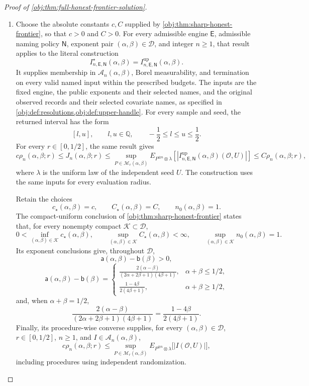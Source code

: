 \documentclass[11pt]{article}
\begin{document}
\begin{proof}[Proof of \cref{obj:thm:full-honest-frontier-solution}]
\begin{enumerate}
\item Choose the absolute constants \(c,C\) supplied by
\cref{obj:thm:sharp-honest-frontier}, so that \(c>0\) and \(C>0\).
For every admissible engine \(\mathsf E\), admissible naming policy
\(\mathsf N\), exponent pair \((\alpha,\beta)\in\mathcal D\), and integer
\(n\ge1\), that result applies to the literal construction
\[
I^\star_{n,\mathsf E,\mathsf N}(\alpha,\beta)
=
I^{\mathrm{up}}_{n,\mathsf E,\mathsf N}(\alpha,\beta).
\]
It supplies membership in \(\mathcal A_n(\alpha,\beta)\), Borel
measurability, and termination on every valid named input within the
prescribed budgets. The inputs are the fixed engine, the public exponents
and their selected names, and the original observed records and their
selected covariate names, as specified in
\cref{obj:def:resolutions,obj:def:upper-handle}. For every sample and seed,
the returned interval has the form
\[
[l,u],\qquad l,u\in\mathbb Q,\qquad
-\frac12\le l\le u\le\frac12.
\]
For every \(r\in[0,1/2]\), the same result gives
\[
c\rho_n(\alpha,\beta;r)
\le J_n(\alpha,\beta;r)
\le
\sup_{P\in\mathcal M_r(\alpha,\beta)}
E_{P^{\otimes n}\otimes\lambda}
\left[
\left|
I^{\mathrm{up}}_{n,\mathsf E,\mathsf N}(\alpha,\beta)
(\mathcal O,U)
\right|
\right]
\le C\rho_n(\alpha,\beta;r),
\]
where \(\lambda\) is the uniform law of the independent seed \(U\).
The construction uses the same inputs for every evaluation radius.

Retain the choices
\[
c_\star(\alpha,\beta)=c,\qquad
C_\star(\alpha,\beta)=C,\qquad
n_0(\alpha,\beta)=1.
\]
The compact-uniform conclusion of
\cref{obj:thm:sharp-honest-frontier} states that, for every nonempty compact
\(\mathcal K\subset\mathcal D\),
\[
0<\inf_{(\alpha,\beta)\in\mathcal K}c_\star(\alpha,\beta),
\qquad
\sup_{(\alpha,\beta)\in\mathcal K}C_\star(\alpha,\beta)<\infty,
\qquad
\sup_{(\alpha,\beta)\in\mathcal K}n_0(\alpha,\beta)=1.
\]
Its exponent conclusions give, throughout \(\mathcal D\),
\[
\mathsf a(\alpha,\beta)-\mathsf b(\beta)>0,
\]
\[
\mathsf a(\alpha,\beta)-\mathsf b(\beta)=
\begin{cases}
\displaystyle
\frac{2(\alpha-\beta)}
{(2\alpha+2\beta+1)(4\beta+1)},
&\alpha+\beta\le1/2,\\[6pt]
\displaystyle
\frac{1-4\beta}{2(4\beta+1)},
&\alpha+\beta\ge1/2,
\end{cases}
\]
and, when \(\alpha+\beta=1/2\),
\[
\frac{2(\alpha-\beta)}
{(2\alpha+2\beta+1)(4\beta+1)}
=
\frac{1-4\beta}{2(4\beta+1)}.
\]
Finally, its procedure-wise converse supplies, for every
\((\alpha,\beta)\in\mathcal D\), \(r\in[0,1/2]\), \(n\ge1\), and
\(I\in\mathcal A_n(\alpha,\beta)\),
\[
c\rho_n(\alpha,\beta;r)
\le
\sup_{P\in\mathcal M_r(\alpha,\beta)}
E_{P^{\otimes n}\otimes\lambda}
\bigl[|I(\mathcal O,U)|\bigr],
\]
including procedures using independent randomization.


\end{enumerate}
\end{proof}
\end{document}
